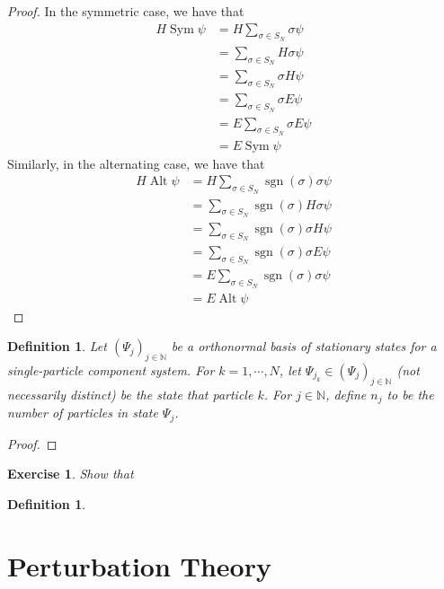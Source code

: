 \documentclass[12pt]{amsart}
\newtheorem{defn}[thm]{Definition}
\newtheorem{ex}[thm]{Exercise}
\newcommand{\sig}{\sigma}
\newcommand{\N}{\mathbb{N}}
\DeclareMathOperator{\alt}{Alt}
\DeclareMathOperator{\sym}{Sym}
\DeclareMathOperator{\sgn}{sgn}
\begin{document}
\begin{proof}
	In the symmetric case, we have that
	\begin{align*}
		H \sym \psi 
		&= H \sum_{\sig \in S_N}\sig \psi \\
		&= \sum_{\sig \in S_N} H \sig \psi \\
		&= \sum_{\sig \in S_N} \sig H \psi \\
		&= \sum_{\sig \in S_N}\sig E \psi \\
		&= E\sum_{\sig \in S_N}\sig E \psi \\
		&= E \sym \psi
	\end{align*}
	Similarly, in the alternating case, we have that
	\begin{align*}
		H \alt \psi 
		&= H \sum_{\sig \in S_N}\sgn(\sig) \sig \psi \\
		&= \sum_{\sig \in S_N} \sgn(\sig) H \sig \psi \\
		&= \sum_{\sig \in S_N} \sgn(\sig) \sig H \psi \\
		&= \sum_{\sig \in S_N}\sgn(\sig) \sig  E \psi \\
		&= E  \sum_{\sig \in S_N}\sgn(\sig) \sig \psi \\
		&= E \alt \psi
	\end{align*}
\end{proof}


\begin{defn}
	Let $(\Psi_j)_{j \in \N}$ be a orthonormal basis of stationary states for a single-particle component system. For $k =1, \cdots, N$, let $\Psi_{j_k} \in (\Psi_j)_{j \in \N}$ (not necessarily distinct) be the state that particle $k$. For $j \in \N$, define $n_j$ to be the number of particles in state $\Psi_j$.
\end{defn}


\begin{proof}
	
\end{proof}

\begin{ex}
	Show that 
\end{ex}

\begin{defn}
	
\end{defn}

\newpage

\section{Perturbation Theory}
\end{document}
